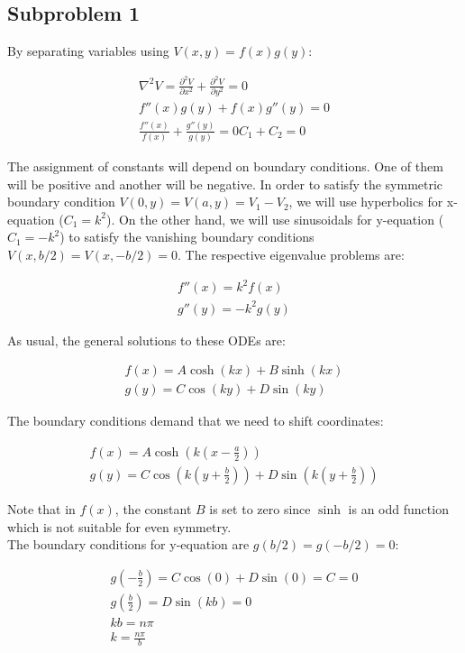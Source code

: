 \documentclass[12pt, a4paper]{article}
\begin{document}
\subsection*{Subproblem 1}

By separating variables using $V(x,y)=f(x)g(y)$:

\begin{gather}
\nabla^2 V=\frac{\partial^2 V}{\partial x^2}+\frac{\partial^2 V}{\partial y^2}=0 \\
f''(x)g(y)+f(x)g''(y)=0 \\
\frac{f''(x)}{f(x)}+\frac{g''(y)}{g(y)}=0
C_1+C_2=0
\end{gather}

The assignment of constants will depend on boundary conditions. One of them will be positive and another will be negative. In order to satisfy the symmetric boundary condition $V(0,y)=V(a,y)=V_1-V_2$, we will use hyperbolics for x-equation ($C_1=k^2$). On the other hand, we will use sinusoidals for y-equation ($C_1=-k^2$) to satisfy the vanishing boundary conditions $V(x,b/2)=V(x,-b/2)=0$. The respective eigenvalue problems are:

\begin{gather}
f''(x)=k^2 f(x) \\
g''(y)=-k^2g(y)
\end{gather}

As usual, the general solutions to these ODEs are:

\begin{gather}
f(x)=A\cosh(kx)+B\sinh(kx) \\
g(y)=C\cos(ky)+D\sin(ky)
\end{gather}

\noindent
The boundary conditions demand that we need to shift coordinates:

\begin{gather}
f(x)=A\cosh\left(k\left(x-\frac{a}{2}\right)\right) \\
g(y)=C\cos\left(k\left(y+\frac{b}{2}\right)\right)+D\sin\left(k\left(y+\frac{b}{2}\right)\right)
\end{gather}

Note that in $f(x)$, the constant $B$ is set to zero since $\sinh$ is an odd function which is not suitable for even symmetry. \\

The boundary conditions for y-equation are $g(b/2)=g(-b/2)=0$:

\begin{gather}
g\left(-\frac{b}{2}\right)=C\cos(0)+D\sin(0)=C=0 \\
g\left(\frac{b}{2}\right)=D\sin\left(kb\right)=0 \\
kb=n\pi \\
k=\frac{n\pi}{b}
\end{gather}
\end{document}
